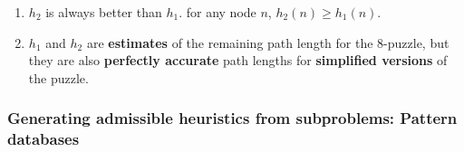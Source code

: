\begin{enumerate}
    \item $h_2$ is always better than $h_1$.
    for any node $n$, $h_2(n) \geq h_1(n)$.
    \hfill \cite{ai/book/Artificial-Intelligence-A-Modern-Approach/Russell-Norvig}

    \item $h_1$ and $h_2$ are \textbf{estimates} of the remaining path length for the $8$-puzzle, but they are also \textbf{perfectly accurate} path lengths for \textbf{simplified versions} of the puzzle.
    \hfill \cite{ai/book/Artificial-Intelligence-A-Modern-Approach/Russell-Norvig}


\end{enumerate}




\subsubsection{Generating admissible heuristics from subproblems: Pattern databases}

